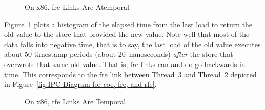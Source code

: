 \documentclass[10]{article}
\begin{document}
\begin{figure}[tb]
\begin{center}
\caption{On x86, fre Links Are Atemporal}
\label{fig:On x86, fre Links Are Atemporal}
\end{center}
\end{figure}

Figure~\ref{fig:On x86, fre Links Are Atemporal}
plots a histogram of the elapsed time from the last load to return the
old value to the store that provided the new value.
Note well that most of the data falls into negative time, that is to say,
the last load of the old value executes about 50 timestamp periods (about
20~nanoseconds) \emph{after} the store that overwrote that same old value.
That is, fre links can and do go backwards in time.
This corresponds to the fre link between Thread~3 and Thread~2 depicted in
Figure~\ref{fig:IPC Diagram for coe, fre, and rfe}.

\begin{figure}[tb]
\begin{center}
\caption{On x86, rfe Links Are Temporal}
\label{fig:On x86, rfe Links Are Temporal}
\end{center}
\end{figure}
\end{document}
